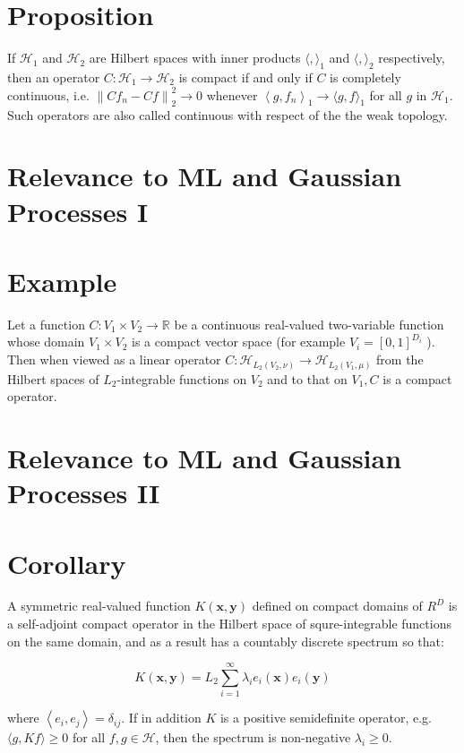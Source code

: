 \documentclass[11pt]{article}
\theoremstyle{plain} %
\theoremstyle{remark}
\begin{document}
\section*{Proposition}
If $\mathcal{H}_{1}$ and $\mathcal{H}_{2}$ are Hilbert spaces with inner
products $\langle,\rangle_{1}$ and $\langle,\rangle_{2}$ respectively, then an
operator $C: \mathcal{H}_{1} \rightarrow \mathcal{H}_{2}$ is compact if and only
if $C$ is completely continuous, i.e. $\left\|C f_{n}-C f\right\|_{2}^{2}
\rightarrow 0$ whenever $\left\langle g, f_{n}\right\rangle_{1}
\rightarrow\langle g, f\rangle_{1}$ for all $g$ in $\mathcal{H}_{1}$. Such
operators are also called continuous with respect of the the weak topology.

\section*{Relevance to ML and Gaussian Processes I}
\section*{Example}
Let a function $C: V_{1} \times V_{2} \rightarrow \mathbb{R}$ be a continuous
real-valued two-variable function whose domain $V_{1} \times V_{2}$ is a compact
vector space (for example $V_{i}=[0,1]^{D_{i}}$ ). Then when viewed as a linear
operator $C: \mathcal{H}_{L_{2}\left(V_{2}, \nu\right)} \rightarrow
\mathcal{H}_{L_{2}\left(V_{1}, \mu\right)}$ from the Hilbert spaces of
$L_{2}$-integrable functions on $V_{2}$ and to that on $V_{1}, C$ is a compact
operator.

\section*{Relevance to ML and Gaussian Processes II}
\section*{Corollary}
A symmetric real-valued function $K(\mathbf{x}, \mathbf{y})$ defined on compact
domains of $R^{D}$ is a self-adjoint compact operator in the Hilbert space of
squre-integrable functions on the same domain, and as a result has a countably
discrete spectrum so that:

$$
K(\mathbf{x}, \mathbf{y})=L_{2} \sum_{i=1}^{\infty} \lambda_{i} e_{i}(\mathbf{x}) e_{i}(\mathbf{y})
$$

where $\left\langle e_{i}, e_{j}\right\rangle=\delta_{i j}$. If in addition $K$
is a positive semidefinite operator, e.g. $\langle g, K f\rangle \geq 0$ for all
$f, g \in \mathcal{H}$, then the spectrum is non-negative $\lambda_{i} \geq 0$.
\end{document}
